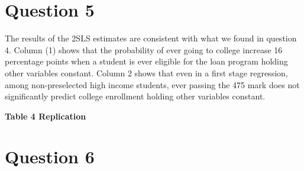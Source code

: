 \documentclass[11pt]{article}
\begin{document}
\section{ Question 5}


The results of the 2SLS estimates are consistent with what we found in question 4. Column (1) shows that the probability of ever going to college increase 16 percentage points when a student is ever eligible for the loan program holding other variables constant.  Column 2 shows that even in a first stage regression, among non-preselected high income students, ever passing the 475 mark does not significantly predict college enrollment holding other variables constant. 

\begin{center}
	\textbf{Table 4 Replication}\par\medskip
	
	
\end{center}



\section{ Question 6}
\end{document}
